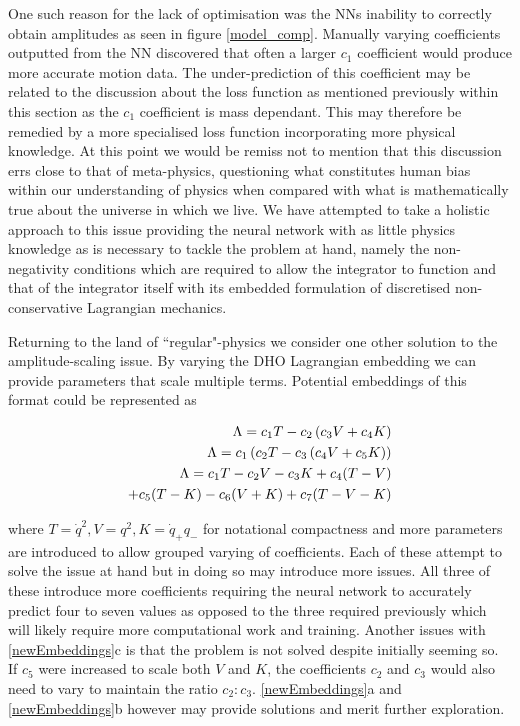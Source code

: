 \documentclass[10pt]{iopart}
\begin{document}
One such reason for the lack of optimisation was the NNs inability to correctly obtain amplitudes as seen in figure \ref{model_comp}. Manually varying coefficients outputted from the NN discovered that often a larger $c_1$ coefficient would produce more accurate motion data. The under-prediction of this coefficient may be related to the discussion about the loss function as mentioned previously within this section as the $c_1$ coefficient is mass dependant. This may therefore be remedied by a more specialised loss function incorporating more physical knowledge. 
At this point we would be remiss not to mention that this discussion errs close to that of meta-physics, questioning what constitutes human bias within our understanding of physics when compared with what is mathematically true about the universe in which we live. We have attempted to take a holistic approach to this issue providing the neural network with as little physics knowledge as is necessary to tackle the problem at hand, namely the non-negativity conditions which are required to allow the integrator to function and that of the integrator itself with its embedded formulation of discretised non-conservative Lagrangian mechanics. 

Returning to the land of ``regular"-physics we consider one other solution to the amplitude-scaling issue. By varying the DHO Lagrangian embedding we can provide parameters that scale multiple terms. Potential embeddings of this format could be represented as

\begin{subequations}
\label{newEmbeddings}
\begin{align}
		\Lambda = c_1 T - c_2\left(c_3V + c_4K\right) \\
		\Lambda = c_1\left(c_2 T - c_3\left(c_4V + c_5K\right)\right) \\
		\Lambda = c_1T - c_2V-c_3K + c_4(T-V)
		\\+ c_5(T-K) - c_6(V+K) + c_7(T-V-K) \notag
\end{align}
\end{subequations}

where $T=\dot q^2, V = q^2, K = \dot q_+q_-$ for notational compactness and more parameters are introduced to allow grouped varying of coefficients. Each of these attempt to solve the issue at hand but in doing so may introduce more issues. All three of these introduce more coefficients requiring the neural network to accurately predict four to seven values as opposed to the three required previously which will likely require more computational work and training. Another issues with \ref{newEmbeddings}c is that the problem is not solved despite initially seeming so. If $c_5$ were increased to scale both $V$ and $K$, the coefficients $c_2$ and $c_3$ would also need to vary to maintain the ratio $c_2:c_3$. \ref{newEmbeddings}a and \ref{newEmbeddings}b however may provide solutions and merit further exploration. 
\end{document}

